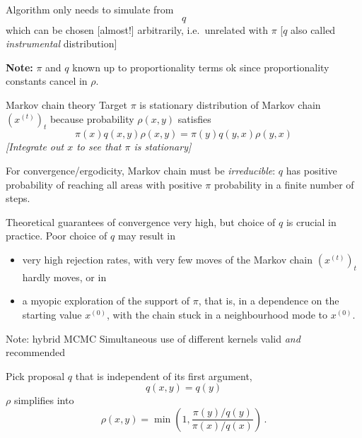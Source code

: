 \begin{slide}
Algorithm only needs to simulate from 
$$q$$ which can be chosen [almost!] arbitrarily, i.e.~unrelated with $\pi$ 
[$q$ also called {\em instrumental} distribution]

\vs
{\bf Note:} $\pi$ and $q$ known up to proportionality terms ok since proportionality constants cancel in $\rho$. 

\end{slide}\begin{slide}

\begin{block}{Markov chain theory}
Target $\pi$ is stationary distribution of Markov chain $(x^{(t)})_t$ because
probability $\rho(x,y)$ satisfies 
$$
\pi(x) q(x,y) \rho(x,y) = \pi(y) q(y,x) \rho(y,x)
$$
{\em [Integrate out $x$ to see that $\pi$ is stationary]}
\end{block}

\vs\pause
For convergence/ergodicity, Markov chain must be {\em irreducible}: $q$ has positive probability of reaching all areas 
with positive $\pi$ probability in a finite number of steps.

\end{slide}\begin{slide}

Theoretical guarantees of convergence very high, but choice of $q$ is crucial in practice. \pause
Poor choice of $q$ may result in 
\begin{itemize}
\item very high rejection rates, with very few moves of the Markov 
chain $(x^{(t)})_t$ hardly moves, or in 
\pause
\item a myopic exploration of the support of $\pi$, that is, in a dependence on
the starting value $x^{(0)}$, with the chain stuck in a neighbourhood mode to $x^{(0)}$.
\end{itemize}

\pause
\begin{block}{Note: hybrid MCMC}
Simultaneous use of different kernels valid {\em and} recommended
\end{block}

\end{slide}\begin{slide}

Pick proposal $q$ that is independent of its first argument,
$$
q(x,y)=q(y)
$$
$\rho$ simplifies into
$$
\rho(x,y)=\min\left(1,\frac{\pi(y)/q(y)}{\pi(x)/q(x)}\right)\,.
$$


\end{slide}
